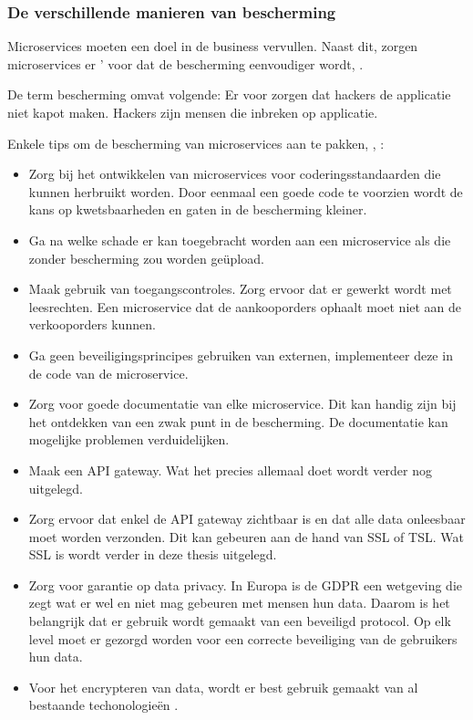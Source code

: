 \subsubsection{De verschillende manieren van bescherming}
Microservices moeten een doel in de business vervullen. Naast dit, zorgen microservices er ' voor dat de bescherming eenvoudiger wordt, \textcite{RDX2016}.

De term bescherming omvat volgende: Er voor zorgen dat hackers de applicatie niet kapot maken.
Hackers zijn mensen die inbreken op applicatie.

Enkele tips om de bescherming van microservices aan te pakken, \textcite{Matteson2017}, \textcite{Silva2017}:
\begin{itemize}
	\item Zorg bij het ontwikkelen van microservices voor coderingsstandaarden die kunnen herbruikt worden. Door eenmaal een goede code te voorzien wordt de kans op kwetsbaarheden en gaten in de bescherming kleiner.
	\item Ga na  welke schade er kan toegebracht worden aan een microservice als die zonder bescherming zou worden geüpload.
	\item Maak gebruik van toegangscontroles. Zorg ervoor dat er gewerkt wordt met leesrechten. Een microservice dat de aankooporders ophaalt moet niet aan de verkooporders kunnen.
	\item Ga geen beveiligingsprincipes gebruiken van externen, implementeer deze in de code van de microservice.
	\item Zorg voor goede documentatie van elke microservice. Dit kan handig zijn bij het ontdekken van een zwak punt in de bescherming. De documentatie kan mogelijke problemen verduidelijken.
	\item Maak een API gateway. Wat het precies allemaal doet wordt verder nog uitgelegd.
	\item Zorg ervoor dat enkel de API gateway zichtbaar is en dat alle data onleesbaar moet worden verzonden. Dit kan gebeuren aan de hand van SSL of TSL. Wat SSL is wordt verder in deze thesis uitgelegd. 
	\item Zorg voor garantie op data privacy. In Europa is de GDPR een  wetgeving die zegt wat er  wel en niet mag gebeuren met mensen hun data. Daarom is het belangrijk dat er gebruik wordt gemaakt van een beveiligd protocol. Op elk level moet er gezorgd worden voor een correcte beveiliging van de gebruikers hun data. 
	\item Voor het encrypteren van data, wordt er best gebruik gemaakt van al bestaande techonologieën . 

\end{itemize}
